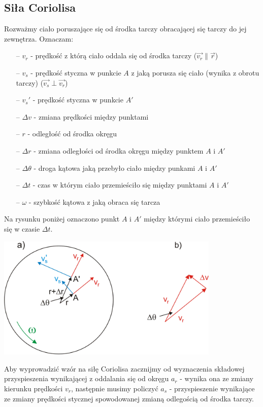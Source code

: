 \documentclass[a4paper]{article}
\begin{document}
    \subsection{\LARGE Siła Coriolisa}
    Rozważmy ciało poruszające się od środka tarczy obracającej się tarczy do jej zewnętrza. 
    Oznaczam:
    \begin{itemize}
        \item [--] $v_r$ - prędkość z którą ciało oddala się od środka tarczy ($\vec{v_r} \parallel \vec{r}$)
        \item [--] $v_s$ - prędkość styczna w punkcie $A$ z jaką porusza się ciało (wynika z obrotu tarczy) ($\vec{v_s} \perp \vec{v_r}$)
        \item [--] $v_s'$ - prędkość styczna w punkcie $A'$
        \item [--] $\Delta v$ - zmiana prędkości między punktami 
        \item [--] $r$ - odległość od środka okręgu
        \item [--] $\Delta r$ - zmiana odległości od środka okręgu między punktem $A$ i $A'$
        \item [--] $\Delta \theta$ - droga kątowa jaką przebyło ciało między punkami $A$ i $A'$
        \item [--] $\Delta t$ - czas w którym ciało przemieściło się między punktami $A$ i $A'$
        \item [--] $\omega$ - szybkość kątowa z jaką obraca się tarcza
    \end{itemize}
    Na rysunku poniżej oznaczono punkt $A$ i $A'$ między którymi ciało przemieściło się w czasie
    $\Delta t$. 
    \begin{center}
        \includegraphics[width=0.8\textwidth]{img/coriolis.png}
    \end{center}
    Aby wyprowadzić wzór na siłę Coriolisa zacznijmy od wyznaczenia składowej przyspieszenia
    wynikającej z oddalania się od okręgu $a_r$ - wynika ona ze zmiany kierunku prędkości $v_r$, 
    następnie musimy policzyć $a_s$ - przyspieszenie wynikające ze zmiany prędkości stycznej spowodowanej
    zmianą odlegością od środka tarczy. 
\end{document}
